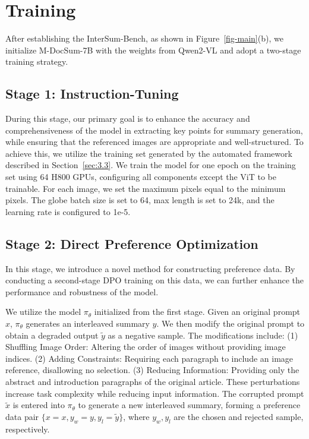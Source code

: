 \section{Training}
After establishing the InterSum-Bench, as shown in Figure~\ref{fig-main}(b), we initialize M-DocSum-7B with the weights from Qwen2-VL and adopt a two-stage training strategy. 



\subsection{Stage 1: Instruction-Tuning}
During this stage, our primary goal is to enhance the accuracy and comprehensiveness of the model in extracting key points for summary generation, while ensuring that the referenced images are appropriate and well-structured.
To achieve this, we utilize the training set generated by the automated framework described in Section~\ref{sec:3.3}.
We train the model for one epoch on the training set using 64 H800 GPUs, configuring all components except the ViT to be trainable. 
For each image, we set the maximum pixels equal to the minimum pixels.
The globe batch size is set to 64, max length is set to 24k, and the learning rate is configured to 1e-5.

\subsection{Stage 2: Direct Preference Optimization}
In this stage, we introduce a novel method for constructing preference data. 
By conducting a second-stage DPO training on this data, we can further enhance the performance and robustness of the model. 

We utilize the model $\pi_\theta$ initialized from the first stage. 
Given an original prompt $x$, $\pi_\theta$ generates an interleaved summary $y$. 
We then modify the original prompt to obtain a degraded output $\widetilde{y}$ as a negative sample. 
The modifications include: (1) Shuffling Image Order: Altering the order of images without providing image indices.
(2) Adding Constraints: Requiring each paragraph to include an image reference, disallowing no selection.
(3) Reducing Information: Providing only the abstract and introduction paragraphs of the original article.
These perturbations increase task complexity while reducing input information. 
The corrupted prompt $\widetilde{x}$ is entered into $\pi_\theta$ to generate a new interleaved summary, forming a preference data pair $\{x=x, y_w=y, y_l=\widetilde{y}\}$, where $y_w, y_l$ are the chosen and rejected sample, respectively.

